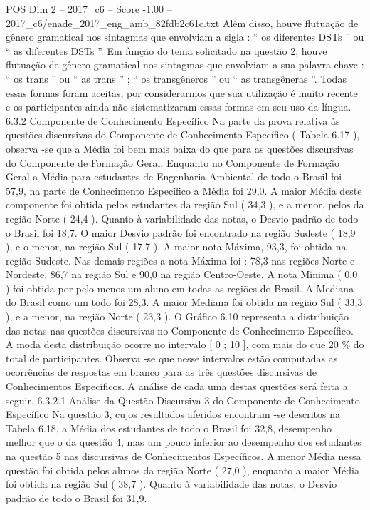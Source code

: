 \begin{textsample}{POS Dim 2 – 2017\_c6 – Score -1.00 – 2017\_c6/enade\_2017\_eng\_amb\_82fdb2c61c.txt}
Além disso, houve flutuação de gênero gramatical nos sintagmas que envolviam a sigla : “ os diferentes DSTs ” ou “ as diferentes DSTs ”.
Em função do tema solicitado na questão 2, houve flutuação de gênero gramatical nos sintagmas que envolviam a sua palavra-chave : “ os trans ” ou “ as trans ” ; “ os transgêneros ” ou “ as transgêneras ”.
Todas essas formas foram aceitas, por considerarmos que sua utilização é muito recente e os participantes ainda não sistematizaram essas formas em seu uso da língua. 6.3.2 Componente de Conhecimento Específico Na parte da prova relativa às questões discursivas do Componente de Conhecimento Específico ( Tabela 6.17 ), observa -se que a Média foi bem mais baixa do que para as questões discursivas do Componente de Formação Geral.
Enquanto no Componente de Formação Geral a Média para estudantes de Engenharia Ambiental de todo o Brasil foi 57,9, na parte de Conhecimento Específico a Média foi 29,0.
A maior Média deste componente foi obtida pelos estudantes da região Sul ( 34,3 ), e a menor, pelos da região Norte ( 24,4 ).
Quanto à variabilidade das notas, o Desvio padrão de todo o Brasil foi 18,7.
O maior Desvio padrão foi encontrado na região Sudeste ( 18,9 ), e o menor, na região Sul ( 17,7 ).
A maior nota Máxima, 93,3, foi obtida na região Sudeste.
Nas demais regiões a nota Máxima foi : 78,3 nas regiões Norte e Nordeste, 86,7 na região Sul e 90,0 na região Centro-Oeste.
A nota Mínima ( 0,0 ) foi obtida por pelo menos um aluno em todas as regiões do Brasil.
A Mediana do Brasil como um todo foi 28,3.
A maior Mediana foi obtida na região Sul ( 33,3 ), e a menor, na região Norte ( 23,3 ).
O Gráfico 6.10 representa a distribuição das notas nas questões discursivas no Componente de Conhecimento Específico.
A moda desta distribuição ocorre no intervalo [ 0 ; 10 ], com mais do que 20 \% do total de participantes.
Observa -se que nesse intervalos estão computadas as ocorrências de respostas em branco para as três questões discursivas de Conhecimentos Específicos.
A análise de cada uma destas questões será feita a seguir. 6.3.2.1 Análise da Questão Discursiva 3 do Componente de Conhecimento Específico Na questão 3, cujos resultados aferidos encontram -se descritos na Tabela 6.18, a Média dos estudantes de todo o Brasil foi 32,8, desempenho melhor que o da questão 4, mas um pouco inferior ao desempenho dos estudantes na questão 5 nas discursivas de Conhecimentos Específicos.
A menor Média nessa questão foi obtida pelos alunos da região Norte ( 27,0 ), enquanto a maior Média foi obtida na região Sul ( 38,7 ).
Quanto à variabilidade das notas, o Desvio padrão de todo o Brasil foi 31,9.

\end{textsample}
